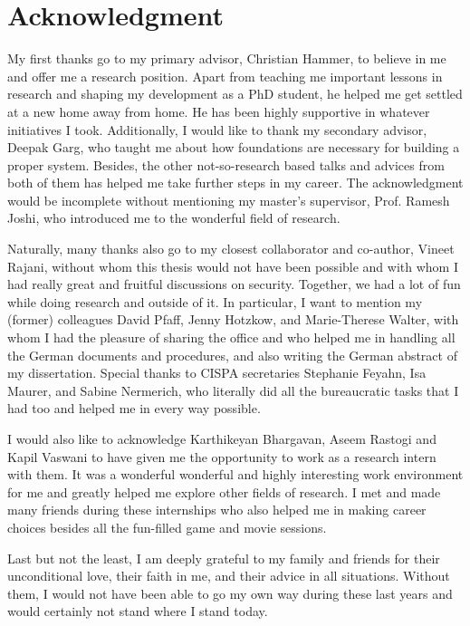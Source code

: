\section*{Acknowledgment}

My first thanks go to my primary advisor, Christian Hammer, to believe
in me and offer me a research position. Apart from teaching me
important lessons in research and shaping my development as a PhD
student, he helped me get settled at a new home away from home. He has
been highly supportive in whatever initiatives I took. Additionally, I
would like to thank my secondary advisor, Deepak Garg, who taught me
about how foundations are necessary for building a proper
system. Besides, the other not-so-research based talks and advices
from both of them has helped me take further steps in my career. The
acknowledgment would be incomplete without mentioning my master's
supervisor, Prof. Ramesh Joshi, who introduced me to the wonderful
field of research.

Naturally, many thanks also go to my closest collaborator and
co-author, Vineet Rajani, without whom this thesis would not have been
possible and with whom I had really great and fruitful discussions on
security. Together, we had a lot of fun while doing research and
outside of it. In particular, I want to mention my (former) colleagues
David Pfaff, Jenny Hotzkow, and Marie-Therese Walter, with whom I had
the pleasure of sharing the office and who helped me in handling all
the German documents and procedures, and also writing the German
abstract of my dissertation. Special thanks to CISPA
secretaries Stephanie Feyahn, Isa Maurer, and Sabine Nermerich, who
literally did all the bureaucratic tasks that I had too and helped me
in every way possible.

I would also like to acknowledge Karthikeyan
Bhargavan, Aseem Rastogi and Kapil Vaswani to have given me the
opportunity to work as a research intern with them. It was a wonderful
wonderful and highly interesting work environment for me and greatly
helped me explore other fields of research. I met and made many
friends during these internships who also helped me in making career
choices besides all the fun-filled game and movie sessions. 

Last but not the least, I am deeply grateful to my family and friends
for their unconditional love, their faith in me, and their advice in all
situations. Without them, I would not have been able to go my own way
during  these last years and would certainly not stand where I stand
today. 

